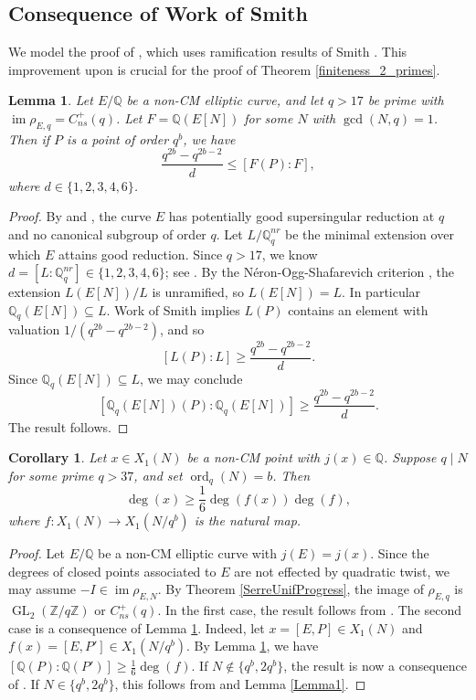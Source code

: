 \documentclass{amsart}
\newtheorem{corollary}{Corollary}
\newtheorem{lemma}{Lemma}
\theoremstyle{definition}
\newcommand{\ord}{\operatorname{ord}}
\newcommand{\Q}{\mathbb{Q}}
\newcommand{\Z}{\mathbb{Z}}
\newcommand{\GL}{\operatorname{GL}}
\DeclareMathOperator{\im}{im}
\begin{document}
\subsection{Consequence of Work of Smith}\label{RamificationResults}  We model the proof of \cite[Theorem 7.3]{Furio2024}, which uses ramification results of Smith \cite{Smith23}. This improvement upon \cite[Proposition 5]{BourdonGenao} is crucial for the proof of Theorem \ref{finiteness_2_primes}.
\begin{lemma} \label{Lemma2}
    Let $E/\Q$ be a non-CM elliptic curve, and let $q>17$ be prime with $\im\rho_{E,q}=C_{ns}^+(q)$. Let $F=\Q(E[N])$ for some $N$ with $\gcd(N,q)=1$. Then if $P$ is a point of order $q^b$, we have 
        \[
        \frac{q^{2b}-q^{2b-2}}{d} \leq [F(P):F],
        \]
        where $d \in \{1,2,3,4,6\}$. 
\end{lemma}
\begin{proof}
    By \cite[Proposition 3.1]{Ejder22} and \cite[Theorem 4.5]{Furio2024}, the curve $E$ has potentially good supersingular reduction at $q$ and no canonical subgroup of order $q$. Let $L/\Q_q^{nr}$ be the minimal extension over which $E$ attains good reduction. Since $q>17$, we know $d=[L:\Q_q^{nr}] \in \{1,2,3,4,6\}$; see \cite[$\S5.6$]{serre72}. By the N\'{e}ron-Ogg-Shafarevich criterion \cite[Theorem 1]{SerreTate}, the extension $L(E[N])/L$ is unramified, so $L(E[N])=L$. In particular $\Q_q(E[N]) \subseteq L$. Work of Smith \cite[Theorem 4.6]{Smith23} implies $L(P)$ contains an element with valuation $1/(q^{2b}-q^{2b-2})$, and so 
    \[
    [L(P):L] \geq \frac{q^{2b}-q^{2b-2}}{d}.
    \]
    Since $\Q_q(E[N]) \subseteq L$, we may conclude
    \[
    [\Q_q(E[N])(P):\Q_q(E[N])] \geq \frac{q^{2b}-q^{2b-2}}{d}. 
    \]
    The result follows.
\end{proof}

\begin{corollary}\label{IntroCor}
Let $x\in X_1(N)$ be a non-CM point with $j(x)\in\Q$. Suppose $q \mid N$ for some prime $q > 37$, and set $\ord_{q}(N)=b$. Then \[
\deg(x)\geq\frac{1}{6}\deg(f(x))\deg(f),
\] where $f:X_1(N) \rightarrow X_1(N/q^b)$ is the natural map.    
\end{corollary}

\begin{proof}
    Let $E/\Q$ be a non-CM elliptic curve with $j(E)=j(x)$. Since the degrees of closed points associated to $E$ are not effected by quadratic twist, we may assume $-I \in \im \rho_{E,N}$. By Theorem \ref{SerreUnifProgress}, the image of $\rho_{E,q}$ is $\GL_2(\Z/q\Z)$ or $C_{ns}^+(q)$. In the first case, the result follows from \cite[Proposition 5.7]{BELOV}. The second case is a consequence of Lemma \ref{Lemma2}. Indeed, let $x=[E,P]\in X_1(N)$ and $f(x)=[E,P']\in X_1(N/q^b)$. By Lemma \ref{Lemma2}, we have $[\Q(P):\Q(P')] \geq \frac{1}{6}\deg(f)$. If $N\not\in\{q^b,2q^b\}$, the result is now a consequence of \cite[Proposition 34]{Algorithm2025}. If $N\in\{q^b,2q^b\}$, this follows from \cite[Proposition 4]{BourdonEjder} and Lemma \ref{Lemma1}.
\end{proof}
\end{document}
